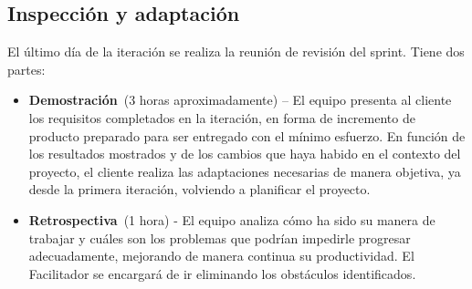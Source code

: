 \subsection{Inspección y adaptación}
El último día de la iteración se realiza la reunión de revisión del sprint. Tiene dos partes:
\begin{itemize}
    \item \textbf{Demostración} (3 horas aproximadamente) – El equipo presenta al cliente los requisitos completados en la iteración, en forma de incremento de producto preparado para ser entregado con el mínimo esfuerzo. En función de los resultados mostrados y de los cambios que haya habido en el contexto del proyecto, el cliente realiza las adaptaciones necesarias de manera objetiva, ya desde la primera iteración, volviendo a planificar el proyecto.
    \item \textbf{Retrospectiva} (1 hora) - El equipo analiza cómo ha sido su manera de trabajar y cuáles son los problemas que podrían impedirle progresar adecuadamente, mejorando de manera continua su productividad. El Facilitador se encargará de ir eliminando los obstáculos identificados.
\end{itemize}